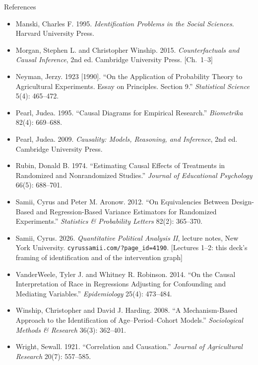 \documentclass[aspectratio=169,11pt,xcolor=dvipsnames]{beamer}
\begin{document}
\begin{frame}[allowframebreaks,t]{References}
\begin{itemize}
Your Estimand? Defining the Target Quantity Connects Statistical Evidence to
Theory.'' \textit{American Sociological Review} 86(3): 532--565.
\item Manski, Charles F. 1995. \textit{Identification Problems in the Social
Sciences}. Harvard University Press.
\item Morgan, Stephen L. and Christopher Winship. 2015.
\textit{Counterfactuals and Causal Inference}, 2nd ed. Cambridge University
Press. [Ch.\ 1--3]
\item Neyman, Jerzy. 1923 [1990]. ``On the Application of Probability Theory
to Agricultural Experiments. Essay on Principles. Section 9.''
\textit{Statistical Science} 5(4): 465--472.
\item Pearl, Judea. 1995. ``Causal Diagrams for Empirical Research.''
\textit{Biometrika} 82(4): 669--688.
\item Pearl, Judea. 2009. \textit{Causality: Models, Reasoning, and
Inference}, 2nd ed. Cambridge University Press.
\item Rubin, Donald B. 1974. ``Estimating Causal Effects of Treatments in
Randomized and Nonrandomized Studies.'' \textit{Journal of Educational
Psychology} 66(5): 688--701.
\item Samii, Cyrus and Peter M. Aronow. 2012. ``On Equivalencies Between
Design-Based and Regression-Based Variance Estimators for Randomized
Experiments.'' \textit{Statistics \& Probability Letters} 82(2): 365--370.
\item Samii, Cyrus. 2026. \textit{Quantitative Political Analysis II}, lecture
notes, New York University. \texttt{cyrussamii.com/?page\_id=4190}.
[Lectures 1--2: this deck's framing of identification and of the intervention graph]
\item VanderWeele, Tyler J. and Whitney R. Robinson. 2014. ``On the Causal
Interpretation of Race in Regressions Adjusting for Confounding and Mediating
Variables.'' \textit{Epidemiology} 25(4): 473--484.
\item Winship, Christopher and David J. Harding. 2008. ``A Mechanism-Based
Approach to the Identification of Age--Period--Cohort Models.''
\textit{Sociological Methods \& Research} 36(3): 362--401.
\item Wright, Sewall. 1921. ``Correlation and Causation.'' \textit{Journal of
Agricultural Research} 20(7): 557--585.
\end{itemize}
\end{frame}
\end{document}
